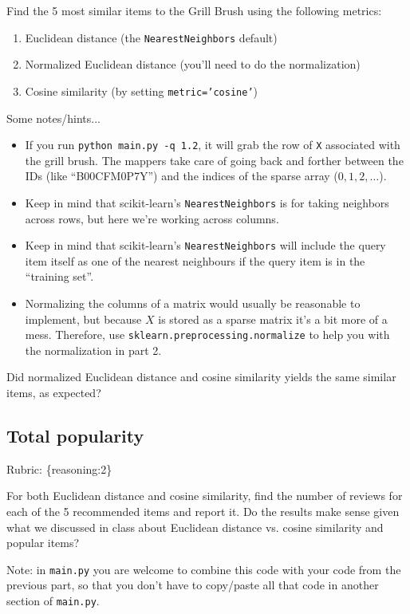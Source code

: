 \documentclass{article}
\def\rubric#1{\gre{Rubric: \{#1\}}}{}
\def\blu#1{{\color{blu}#1}}
\def\gre#1{{\color{gre}#1}}
\begin{document}
\blu{Find the 5 most similar items to the Grill Brush using the following metrics:}

\begin{enumerate}
\item Euclidean distance (the \texttt{NearestNeighbors} default)
\item Normalized Euclidean distance (you'll need to do the normalization)
\item Cosine similarity (by setting \texttt{metric='cosine'})
\end{enumerate}

Some notes/hints...

\begin{itemize}
\item If you run \texttt{python main.py -q 1.2}, it will grab the row of \texttt{X} associated with the grill brush. The mappers take care of going back and forther between the IDs (like ``B00CFM0P7Y'') and the indices of the sparse array ($0,1,2,\ldots$).
\item Keep in mind that scikit-learn's \texttt{NearestNeighbors} is for taking neighbors across rows, but here we're working across columns.
\item Keep in mind that scikit-learn's \texttt{NearestNeighbors} will include the query item itself as one of the nearest neighbours if the query item is in the ``training set''.
\item Normalizing the columns of a matrix would usually be reasonable to implement, but because $X$ is stored as a sparse matrix it's a bit more of a mess. Therefore, use \texttt{sklearn.preprocessing.normalize} to help you with the normalization in part 2.
\end{itemize}

\blu{Did normalized Euclidean distance and cosine similarity yields the same similar items, as expected?}


\subsection{Total popularity}
\rubric{reasoning:2}

\blu{For both Euclidean distance and cosine similarity, find the number of reviews for each of the 5 recommended items and report it. Do the results make sense given what we discussed in class about Euclidean distance vs. cosine similarity and popular items?}

Note: in \texttt{main.py} you are welcome to combine this code with your code from the previous part, so that you don't have to copy/paste all that code in another section of \texttt{main.py}.
\end{document}
